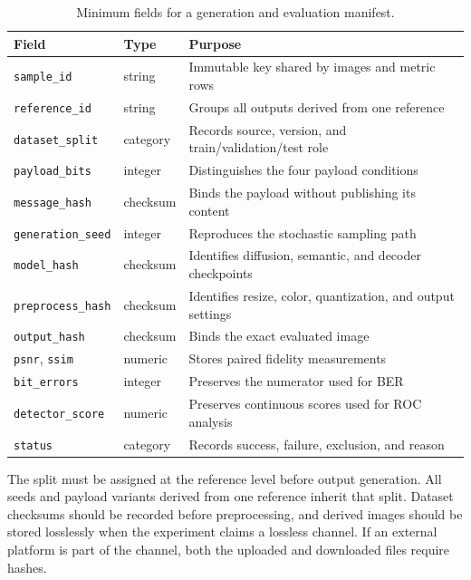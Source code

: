 \documentclass[pdflatex,sn-mathphys-num]{sn-jnl}
\begin{document}
\begin{appendices}
\begin{table}[!h]
\centering
\caption{Minimum fields for a generation and evaluation manifest.}
\label{tab:manifest}
\footnotesize
\begin{tabularx}{\columnwidth}{p{2.5cm}p{1.8cm}X}
\toprule
\textbf{Field} & \textbf{Type} & \textbf{Purpose} \\
\midrule
\texttt{sample\_id} & string & Immutable key shared by images and metric rows \\
\texttt{reference\_id} & string & Groups all outputs derived from one reference \\
\texttt{dataset\_split} & category & Records source, version, and train/validation/test role \\
\texttt{payload\_bits} & integer & Distinguishes the four payload conditions \\
\texttt{message\_hash} & checksum & Binds the payload without publishing its content \\
\texttt{generation\_seed} & integer & Reproduces the stochastic sampling path \\
\texttt{model\_hash} & checksum & Identifies diffusion, semantic, and decoder checkpoints \\
\texttt{preprocess\_hash} & checksum & Identifies resize, color, quantization, and output settings \\
\texttt{output\_hash} & checksum & Binds the exact evaluated image \\
\texttt{psnr}, \texttt{ssim} & numeric & Stores paired fidelity measurements \\
\texttt{bit\_errors} & integer & Preserves the numerator used for BER \\
\texttt{detector\_score} & numeric & Preserves continuous scores used for ROC analysis \\
\texttt{status} & category & Records success, failure, exclusion, and reason \\
\bottomrule
\end{tabularx}
\end{table}

The split must be assigned at the reference level before output generation. All seeds and payload variants derived from one reference inherit that split. Dataset checksums should be recorded before preprocessing, and derived images should be stored losslessly when the experiment claims a lossless channel. If an external platform is part of the channel, both the uploaded and downloaded files require hashes.


\end{appendices}
\end{document}
